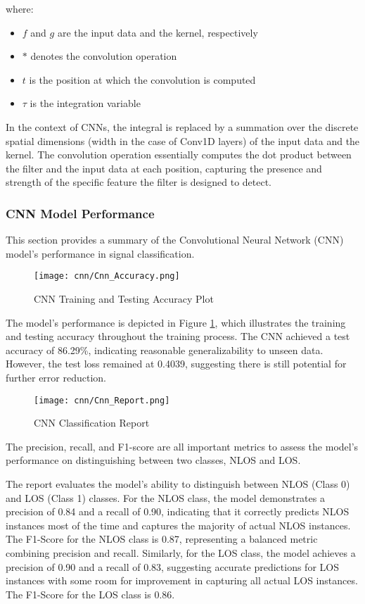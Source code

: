 where:

\begin{itemize}
  \item $f$ and $g$ are the input data and the kernel, respectively
  \item $*$ denotes the convolution operation
  \item $t$ is the position at which the convolution is computed
  \item $\tau$ is the integration variable
\end{itemize}

In the context of CNNs, the integral is replaced by a summation over the discrete spatial dimensions (width in the case of Conv1D layers) of the input data and the kernel. The convolution operation essentially computes the dot product between the filter and the input data at each position, capturing the presence and strength of the specific feature the filter is designed to detect.


\subsubsection{CNN Model Performance}

This section provides a summary of the Convolutional Neural Network (CNN) model's performance in signal classification.

\begin{figure}[H] 
	\centering
	\texttt{[image: cnn/Cnn\_Accuracy.png]}
	\caption{CNN Training and Testing Accuracy Plot}\label{cnn_accuracy}
\end{figure}

The model's performance is depicted in Figure \ref{cnn_accuracy}, which illustrates the training and testing accuracy throughout the training process. The CNN achieved a test accuracy of 86.29\%, indicating reasonable generalizability to unseen data. However, the test loss remained at 0.4039, suggesting there is still potential for further error reduction. 

\begin{figure}[H] 
	\centering
	\texttt{[image: cnn/Cnn\_Report.png]}
	\caption{CNN Classification Report}\label{cnn_report}
\end{figure}

The precision, recall, and F1-score are all important metrics to assess the model's performance on distinguishing between two classes, NLOS and LOS.

The report evaluates the model's ability to distinguish between NLOS (Class 0) and LOS (Class 1) classes. For the NLOS class, the model demonstrates a precision of  0.84 and a recall of 0.90, indicating that it correctly predicts NLOS instances most of the time and captures the majority of actual NLOS instances. The F1-Score for the NLOS class is 0.87, representing a balanced metric combining precision and recall. Similarly, for the LOS class, the model achieves a precision of 0.90 and a recall of 0.83, suggesting accurate predictions for LOS instances with some room for improvement in capturing all actual LOS instances. The F1-Score for the LOS class is 0.86.

